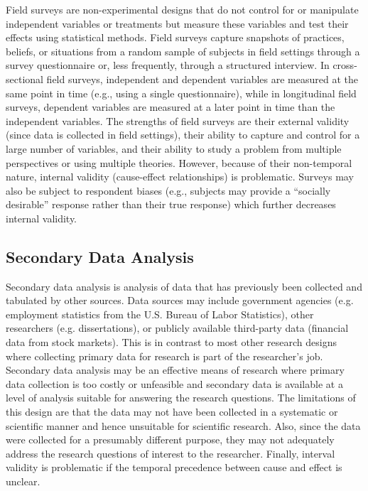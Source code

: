 Field surveys are non-experimental designs that do not control for or manipulate independent variables or treatments but measure these variables and test their effects using statistical methods. Field surveys capture snapshots of practices, beliefs, or situations from a random sample of subjects in field settings through a survey questionnaire or, less frequently, through a structured interview. In cross-sectional field surveys, independent and dependent variables are measured at the same point in time (e.g., using a single questionnaire), while in longitudinal field surveys, dependent variables are measured at a later point in time than the independent variables. The strengths of field surveys are their external validity (since data is collected in field settings), their ability to capture and control for a large number of variables, and their ability to study a problem from multiple perspectives or using multiple theories. However, because of their non-temporal nature, internal validity (cause-effect relationships) is problematic. Surveys may also be subject to respondent biases (e.g., subjects may provide a ``socially desirable'' response rather than their true response) which further decreases internal validity.

\subsection{Secondary Data Analysis}

Secondary data analysis is analysis of data that has previously been collected and tabulated by other sources. Data sources may include government agencies (e.g. employment statistics from the U.S. Bureau of Labor Statistics), other researchers (e.g. dissertations), or publicly available third-party data (financial data from stock markets). This is in contrast to most other research designs where collecting primary data for research is part of the researcher's job. Secondary data analysis may be an effective means of research where primary data collection is too costly or unfeasible and secondary data is available at a level of analysis suitable for answering the research questions. The limitations of this design are that the data may not have been collected in a systematic or scientific manner and hence unsuitable for scientific research. Also, since the data were collected for a presumably different purpose, they may not adequately address the research questions of interest to the researcher. Finally, interval validity is problematic if the temporal precedence between cause and effect is unclear.

